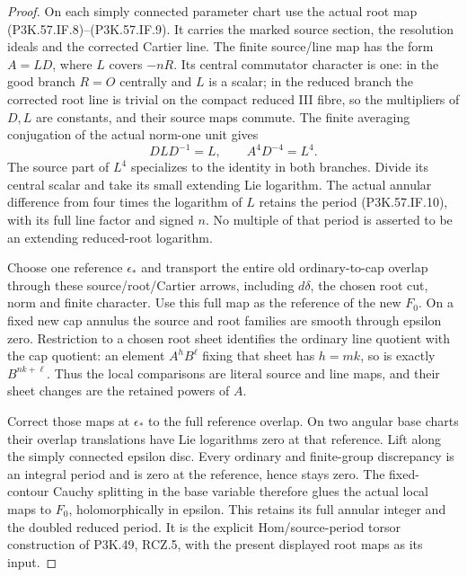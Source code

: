 \begin{proof}
On each simply connected parameter chart use the actual
root map (P3K.57.IF.8)--\allowbreak (P3K.57.IF.9). It carries the marked source
section, the resolution ideals and the corrected Cartier
line. The finite source/line map has the form \(A=LD\),
where \(L\) covers \(-nR\). Its central commutator
character is one: in the good branch \(R=O\) centrally
and \(L\) is a scalar; in the reduced branch the
corrected root line is trivial on the compact reduced
III fibre, so the multipliers of \(D,L\) are constants,
and their source maps commute. The finite averaging
conjugation of the actual norm-one unit gives
\[
 DLD^{-1}=L,\qquad A^4D^{-4}=L^4 .
\]
The source part of \(L^4\) specializes to the identity
in both branches. Divide its central scalar and take
its small extending Lie logarithm. The actual annular
difference from four times the logarithm of \(L\)
retains the period (P3K.57.IF.10), with its full line factor
and signed \(n\). No multiple of that period is
asserted to be an extending reduced-root logarithm.

Choose one reference \(\epsilon_*\) and transport the
entire old ordinary-to-cap overlap through these
source/root/Cartier arrows, including \(d\delta\),
the chosen root cut, norm and finite character.
Use this full map as the reference of the new
\(F_0\). On a fixed new cap annulus the source and
root families are smooth through epsilon zero.
Restriction to a chosen root sheet identifies
the ordinary line quotient with the cap quotient:
an element \(A^hB^\ell\) fixing that sheet has
\(h=mk\), so is exactly \(B^{nk+\ell}\).
Thus the local comparisons are literal source
and line maps, and their sheet changes are the
retained powers of \(A\).

Correct those maps at \(\epsilon_*\) to the full
reference overlap. On two angular base charts
their overlap translations have Lie logarithms
zero at that reference. Lift along the simply
connected epsilon disc. Every ordinary and
finite-group discrepancy is an integral period
and is zero at the reference, hence stays zero.
The fixed-contour Cauchy splitting in the base
variable therefore glues the actual local maps
to \(F_0\), holomorphically in epsilon. This
retains its full annular integer and the
doubled reduced period. It is the explicit
Hom/source-period torsor construction of
P3K.49, RCZ.5, with the present displayed root maps
as its input.


\end{proof}
